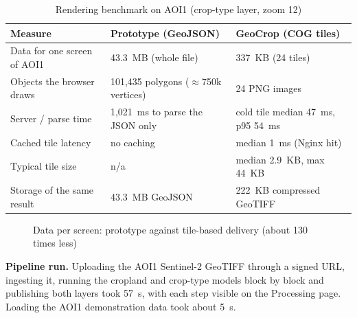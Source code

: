 \begin{table}[htbp]
\centering\small
\caption{Rendering benchmark on AOI1 (crop-type layer, zoom 12)}
\label{tab:benchmark}
\begin{tabularx}{\textwidth}{L{4.6cm} Y Y}
\toprule
\textbf{Measure} & \textbf{Prototype (GeoJSON)} & \textbf{GeoCrop (COG tiles)}\\
\midrule
Data for one screen of AOI1 & 43.3~MB (whole file) & 337~KB (24 tiles)\\
Objects the browser draws & 101,435 polygons ($\approx$750k vertices) & 24 PNG images\\
Server / parse time & 1,021~ms to parse the JSON only & cold tile median 47~ms, p95 54~ms\\
Cached tile latency & no caching & median 1~ms (Nginx hit)\\
Typical tile size & n/a & median 2.9~KB, max 44~KB\\
Storage of the same result & 43.3~MB GeoJSON & 222~KB compressed GeoTIFF\\
\bottomrule
\end{tabularx}
\end{table}

\begin{figure}[htbp]
\centering
{}
\caption{Data per screen: prototype against tile-based delivery (about 130 times less)}
\label{fig:benchmark}
\end{figure}

\textbf{Pipeline run.} Uploading the AOI1 Sentinel-2 GeoTIFF through a signed URL, ingesting it,
running the cropland and crop-type models block by block and publishing both layers took 57~s,
with each step visible on the Processing page. Loading the AOI1 demonstration data took about 5~s.

